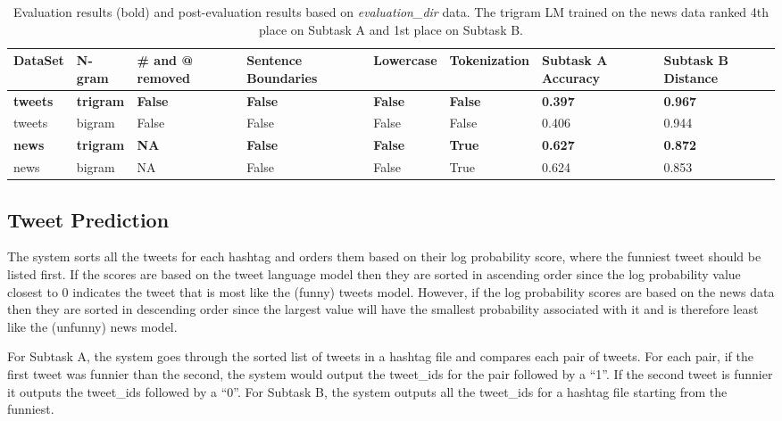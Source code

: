 \documentclass[11pt,a4paper]{article}
\begin{document}
\begin{table*}[h!]
\centering
\begin{tabular}{ |p{1.2cm}|p{1.2cm}|p{1.2cm}|p{1.7cm}|p{1.5cm}|p{1.9cm}|p{1.7cm}|p{1.7cm}|}
\hline
DataSet & N-gram & \# and @ removed  & Sentence Boundaries & Lowercase & Tokenization & Subtask A Accuracy & Subtask B Distance \\
\hline
\textbf{tweets} & \textbf{trigram} & \textbf{False} & \textbf{False} & \textbf{False} & \textbf{False} & \textbf{0.397} & \textbf{0.967} \\
\hline
tweets & bigram & False & False & False & False & 0.406 & 0.944 \\
\hline
\textbf{news} & \textbf{trigram} & \textbf{NA} & \textbf{False} & \textbf{False} & \textbf{True} & \textbf{0.627} & \textbf{0.872} \\
\hline
news & bigram & NA & False & False & True & 0.624 & 0.853 \\
\hline
\end{tabular}
\caption{Evaluation results (bold) and post-evaluation results based on \textit{evaluation\_dir} data. The trigram LM trained on the news data ranked 4th place on Subtask A and 1st place on Subtask B.}
\label{table:3}
\end{table*}

\subsection{Tweet Prediction}

The system sorts all the tweets for each hashtag and orders 
them based on their log probability
score, where the funniest tweet should be listed first. If the scores are based
on the tweet language model then they are sorted in ascending order since the
log probability value closest to 0 indicates the tweet that is most 
like the (funny) tweets model. 
However, if the log probability scores are based on the news data then they
are sorted in descending order since the largest value will have the 
smallest probability associated with it and is therefore least like
the (unfunny) news model.

For Subtask A, the system goes through the sorted list of tweets in a hashtag file
and compares each pair of tweets. For each pair, if the first tweet was funnier 
than the second, the system would output the tweet\_ids for the pair 
followed by a ``1''. If the second tweet is funnier it outputs the tweet\_ids 
followed by a ``0''. For Subtask B, the system outputs all the tweet\_ids for
a hashtag file starting from the funniest. 
\end{document}
